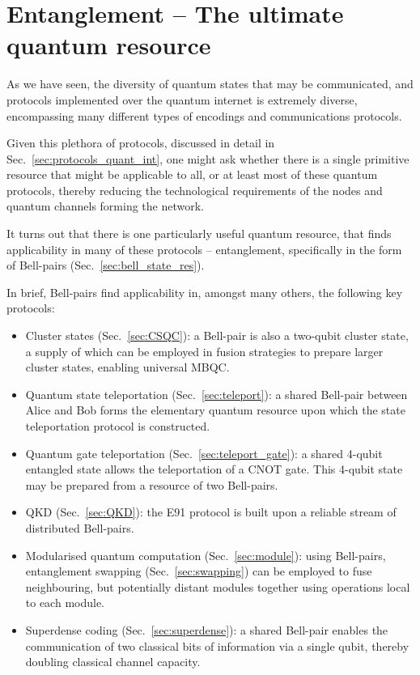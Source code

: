 %
%

\section{Entanglement -- The ultimate quantum resource} \label{sec:ent_ultimate} 

As we have seen, the diversity of quantum states that may be communicated, and protocols implemented over the quantum internet is extremely diverse, encompassing many different types of encodings and communications protocols.

Given this plethora of protocols, discussed in detail in Sec.~\ref{sec:protocols_quant_int}, one might ask whether there is a single primitive resource that might be applicable to all, or at least most of these quantum protocols, thereby reducing the technological requirements of the nodes and quantum channels forming the network.

It turns out that there is one particularly useful quantum resource, that finds applicability in many of these protocols -- entanglement, specifically in the form of Bell-pairs (Sec.~\ref{sec:bell_state_res}).

In brief, Bell-pairs find applicability in, amongst many others, the following key protocols:
\begin{itemize}
\item Cluster states (Sec.~\ref{sec:CSQC}): a Bell-pair is also a two-qubit cluster state, a supply of which can be employed in fusion strategies to prepare larger cluster states, enabling universal MBQC.
\item Quantum state teleportation (Sec.~\ref{sec:teleport}): a shared Bell-pair between Alice and Bob forms the elementary quantum resource upon which the state teleportation protocol is constructed.
\item Quantum gate teleportation (Sec.~\ref{sec:teleport_gate}): a shared 4-qubit entangled state allows the teleportation of a CNOT gate. This 4-qubit state may be prepared from a resource of two Bell-pairs.
\item QKD (Sec.~\ref{sec:QKD}): the E91 protocol is built upon a reliable stream of distributed Bell-pairs.
\item Modularised quantum computation (Sec.~\ref{sec:module}): using Bell-pairs, entanglement swapping (Sec.~\ref{sec:swapping}) can be employed to fuse neighbouring, but potentially distant modules together using operations local to each module.
\item Superdense coding (Sec.~\ref{sec:superdense}): a shared Bell-pair enables the communication of two classical bits of information via a single qubit, thereby doubling classical channel capacity.
\end{itemize}

